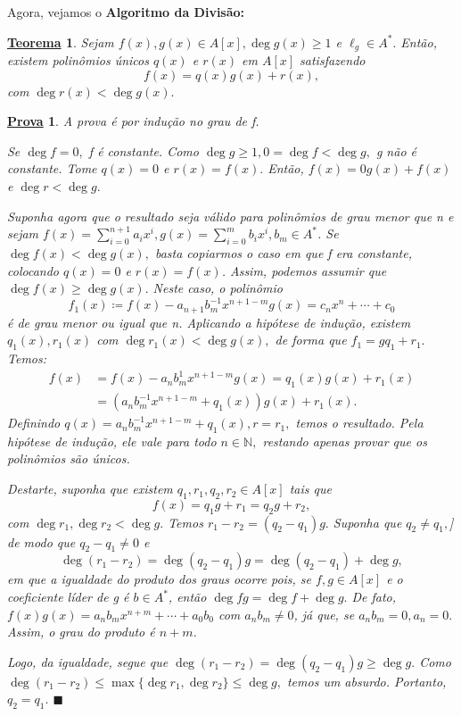 \documentclass{article}
\newtheorem*{theorem*}{\underline{Teorema}}
\newtheorem*{proof*}{\underline{Prova}}
\renewcommand\qedsymbol{$\blacksquare$}
\begin{document}
Agora, vejamos o \textbf{Algoritmo da Divisão:}
\begin{theorem*}
  Sejam \(f(x), g(x)\in A[x], \deg{g(x)}\geq 1\) e \(\ell_{g}\in A^{*}.\) Então,
  existem polinômios únicos \(q(x)\) e \(r(x)\) em \(A[x]\) satisfazendo 
  \[
    f(x) = q(x)g(x) + r(x),
  \]
  com \(\deg{r(x)} < \deg{g(x)}.\)
\end{theorem*}
\begin{proof*}
  A prova é por indução no grau de f.

  Se \(\deg{f}=0,\) f é constante. Como \(\deg{g}\geq 1, 0 = \deg{f} < \deg{g},\) g não é constante.
  Tome \(q(x) = 0\) e \(r(x) = f(x).\) Então, \(f(x) = 0g(x) + f(x)\) e \(\deg{r} < \deg{g}.\)

  Suponha agora que o resultado seja válido para polinômios de grau menor que n e sejam \(f(x) = \sum\limits_{i=0}^{n+1}a_{i}x^{i}, g(x) = \sum\limits_{i=0}^{m}b_{i}x^{i}, b_{m}\in A^{*}\).
  Se \(\deg{f(x)} < \deg{g(x)},\) basta copiarmos o caso em que f era constante, colocando \(q(x) = 0\) e \(r(x) = f(x)\).
  Assim, podemos assumir que \(\deg{f(x)}\geq \deg{g(x)}.\) Neste caso, o polinômio 
  \[
    f_{1}(x)\coloneqq f(x) - a_{n+1}b_{m}^{-1}x^{n+1-m}g(x) = c_{n}x^{n} + \cdots + c_{0}
  \] 
  é de grau menor ou igual que n. Aplicando a hipótese de indução, existem \(q_{1}(x), r_{1}(x)\) 
  com \(\deg{r_{1}(x)} < \deg{g(x)},\) de forma que \(f_{1} = gq_{1} + r_{1}.\) Temos:
  \begin{align*}
    f(x) &= f(x)-a_{n}b_{m}^{1}x^{n+1-m}g(x) = q_{1}(x)g(x) + r_{1}(x)\\
         &= (a_{n}b_{m}^{-1}x^{n+1-m}+q_{1}(x))g(x) + r_{1}(x).
  \end{align*}
  Definindo \(q(x) = a_{n}b_{m}^{-1}x^{n+1-m}+q_{1}(x), r = r_{1},\) temos o resultado. Pela hipótese
  de indução, ele vale para todo \(n\in \mathbb{N},\) restando apenas provar que os polinômios são únicos.

  Destarte, suponha que existem \(q_{1}, r_{1}, q_{2}, r_{2}\in A[x]\) tais que 
  \[
    f(x) = q_{1}g+r_{1} = q_{2}g+r_{2},
  \]
  com \(\deg{r_{1}}, \deg{r_{2}} < \deg{g}.\) Temos \(r_{1}-r_{2} = (q_{2}-q_{1})g.\) Suponha que \(q_{2}\neq q_{1},\)]
  de modo que \(q_{2}-q_{1}\neq0\) e 
  \[
    \deg{(r_{1}-r_{2})} = \deg{(q_{2}-q_{1})}g = \deg{(q_{2}-q_{1})} + \deg{g},
  \]
  em que a igualdade do produto dos graus ocorre pois, se \(f, g\in A[x]\) e o coeficiente líder de g é \(b\in A^{*}\),
  então \(\deg{fg} = \deg{f} + \deg{g}.\) De fato, \(f(x)g(x) = a_{n}b_{m}x^{n+m} + \cdots + a_{0}b_{0}\) com
  \(a_{n}b_{m}\neq0\), já que, se \(a_{n}b_{m} = 0, a_{n} = 0.\) Assim, o grau do produto é \(n+m\).

  Logo, da igualdade, segue que \(\deg{(r_{1}-r_{2})} = \deg{(q_{2}-q_{1})g}\geq \deg{g}.\) Como
  \(\deg{(r_{1}-r_{2})}\leq \max\{\deg{r_{1}}, \deg{r_{2}}\}\leq \deg{g},\) temos um absurdo. Portanto,
  \(q_{2} = q_{1}.\) \qedsymbol
\end{proof*}
\end{document}
